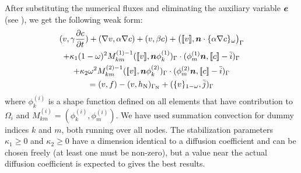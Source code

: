 After substituting the numerical fluxes and eliminating the auxiliary variable
$\boldsymbol{e}$ (see \cite{Choi11}), we get the following weak form:
\begin{multline}
   (v,\gamma\pderiv{c}t)
   +(\nabla v,\alpha\nabla c) + (v,\beta c)
            +\big(\lj v\rj,\vek n\cdot\{\alpha\nabla c\}_\omega\big)_{\Gamma}\\
 +\kappa_1(1-\omega)^2 M_{km}^{(1)-1}(\lj v\rj,\vec
n\phi^{(1)}_k)_\Gamma\cdot(\phi^{(1)}_m\vek n,\lj c\rj-
         \bar i)_\Gamma \\
 +\kappa_2\omega^2 M_{km}^{(2)-1}(\lj v\rj,\vec
n\phi^{(2)}_k)_\Gamma\cdot(\phi^{(2)}_m\vek n,\lj c\rj-
         \bar i)_\Gamma\\
 =(v,f) - (v,h_{\text{N}})_{\Gamma_{\text{N}}}
                               +(\{v\}_{1-\omega},\bar j)_\Gamma
   \label{eq:weakdiffusioninterface}
\end{multline}
where $\phi^{(i)}_k$ is a shape function defined on all elements that have
contribution to $\Omega_i$ and
$M^{(i)}_{km}=(\phi^{(i)}_k,\phi^{(i)}_m)$.
We have used summation convection for dummy indices $k$ and $m$,
both running over all nodes.
The stabilization parameters $\kappa_1\geq0$ and $\kappa_2\geq0$
have a dimension
identical to a diffusion coefficient and can be chosen freely (at least one
must be non-zero), but a value
near the actual
diffusion coefficient is expected to gives the best results.

